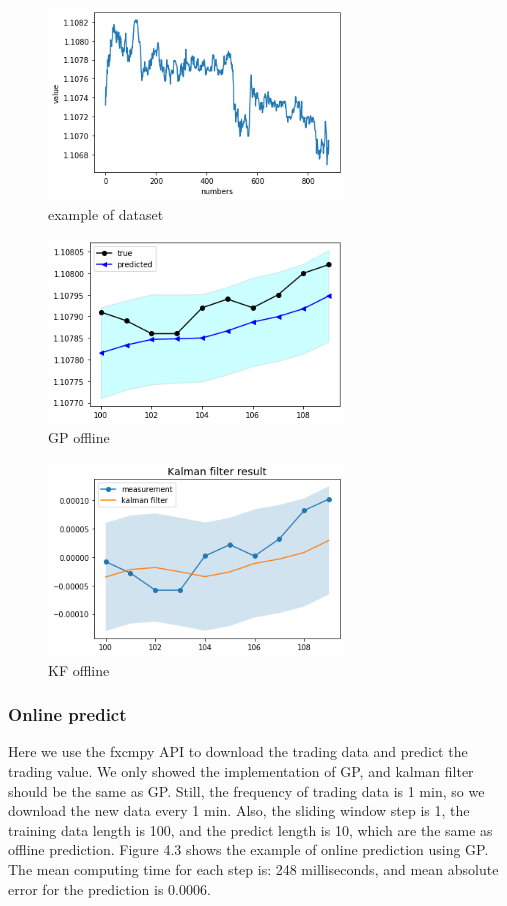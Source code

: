\documentclass[12pt]{article}
\begin{document}
\begin{figure}[H]
\centering 
\includegraphics[width=0.7\textwidth]{fig/section4/example.png}
\caption{example of dataset}
\end{figure}

\begin{figure}[H]
\centering 
\includegraphics[width=0.7\textwidth]{fig/section4/GPoffline.png}
\caption{GP offline}
\end{figure}


\begin{figure}[H]
\centering 
\includegraphics[width=0.7\textwidth]{fig/section4/KFoffline.png}
\caption{KF offline}
\end{figure}


\subsubsection{Online predict}
Here we use the fxcmpy API to download the trading data and predict the trading value. We only showed the implementation of GP, and kalman filter should be the same as GP. Still, the frequency of trading data is 1 min, so we download the new data every 1 min. Also, the sliding window step is 1, the training data length is 100, and the predict length is 10, which are the same as offline prediction. Figure 4.3 shows the example of online prediction using GP. The mean computing time for each step is: 248 milliseconds, and mean absolute error for the prediction is 0.0006. 
\end{document}
